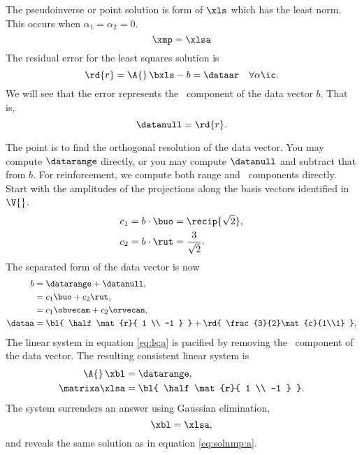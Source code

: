 The pseudoinverse or point solution is form of $\xls$ which has the least norm. This occurs when $\alpha_{1} = \alpha_{2} = 0$.
%
\begin{equation}
  \xmp = \xlsa
  \label{eq:solnmp:a}
\end{equation}
%
The residual error for the least squares solution is
%
\begin{equation}
  {\rd{ r }} = \A{}\,\bxls - b = \dataar \quad \forall \alpha\ic.
\end{equation}
%
We will see that the error represents the \ns\ component of the data vector $b$. That is,
%
\begin{equation}
  \datanull = {\rd{ r }}.
\end{equation}

%
The point is to find the orthogonal resolution of the data vector. You may compute $\datarange$ directly, or you may compute $\datanull$ and subtract that from $b$. For reinforcement, we compute both range and \ns\ components directly. Start with the amplitudes of the projections along the basis vectors identified in $\V{}$. 
\begin{equation}
  \begin{split}
    c_{1} = b \cdot \buo &= \recip{\sqrt{2}} , \\
    c_{2} = b \cdot \rut &= \frac{3}{\sqrt{2}} .
  \end{split}
\end{equation}
%
The separated form of the data vector is now
%
\begin{equation}
  \begin{split}
     b &= \datarange + \datanull, \\
       &= c_{1} \buo + c_{2} \rut, \\
       &= c_{1}\obvecam + c_{2}\orvecan, \\
     \dataa &= {\bl{ \half \mat{r}{ 1 \\ -1 } }} + {\rd{ \frac{3}{2}\mat{c}{1\\1} }}.
  \end{split}
  \label{eq:regularize:a}
\end{equation}
%
The linear system in equation \eqref{eq:ls:a} is pacified by removing the \ns\ component of the data vector. The resulting consistent linear system is
\begin{equation}
  \begin{split}
    \A{}\, \xbl &= \datarange, \\
    \matrixa \xlsa &= {\bl{ \half \mat{r}{ 1 \\ -1 } }} .
  \end{split}
\end{equation}
The system surrenders an answer using Gaussian elimination,
%
\begin{equation}
  \xbl = \xlsa,
\end{equation}
and reveals the same solution as in equation \eqref{eq:solnmp:a}.

